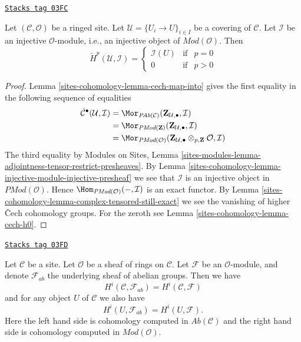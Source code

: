\begin{lemma}
\label{sites-cohomology-lemma-injective-module-trivial-cech}
\href{https://stacks.math.columbia.edu/tag/03FC}{\texttt{Stacks tag 03FC}}

Let $(\mathcal{C}, \mathcal{O})$ be a ringed site.
Let $\mathcal{U} = \{U_i \to U\}_{i \in I}$ be a covering of $\mathcal{C}$.
Let $\mathcal{I}$ be an injective $\mathcal{O}$-module, i.e., an injective
object of $\textit{Mod}(\mathcal{O})$. Then
$$
\check{H}^p(\mathcal{U}, \mathcal{I}) =
\left\{
\begin{matrix}
\mathcal{I}(U) & \text{if} & p = 0 \\
0 & \text{if} & p > 0
\end{matrix}
\right.
$$
\end{lemma}

\begin{proof}
Lemma \ref{sites-cohomology-lemma-cech-map-into} gives the first equality in the following
sequence of equalities
\begin{align*}
\check{\mathcal{C}}^\bullet(\mathcal{U}, \mathcal{I})
& =
\Mor_{\textit{PAb}(\mathcal{C})}(
\mathbf{Z}_{\mathcal{U}, \bullet}, \mathcal{I}) \\
& =
\Mor_{\textit{PMod}(\mathbf{Z})}(
\mathbf{Z}_{\mathcal{U}, \bullet}, \mathcal{I}) \\
& =
\Mor_{\textit{PMod}(\mathcal{O})}(
\mathbf{Z}_{\mathcal{U}, \bullet} \otimes_{p, \mathbf{Z}} \mathcal{O},
\mathcal{I})
\end{align*}
The third equality by
Modules on Sites,
Lemma \ref{sites-modules-lemma-adjointness-tensor-restrict-presheaves}.
By Lemma \ref{sites-cohomology-lemma-injective-module-injective-presheaf}
we see that $\mathcal{I}$ is an injective object in
$\textit{PMod}(\mathcal{O})$.
Hence $\Hom_{\textit{PMod}(\mathcal{O})}(-, \mathcal{I})$
is an exact functor. By
Lemma \ref{sites-cohomology-lemma-complex-tensored-still-exact} we see the vanishing of
higher {\v C}ech cohomology groups.
For the zeroth see Lemma \ref{sites-cohomology-lemma-cech-h0}.
\end{proof}

\begin{lemma}
\label{sites-cohomology-lemma-cohomology-modules-abelian-agree}
\href{https://stacks.math.columbia.edu/tag/03FD}{\texttt{Stacks tag 03FD}}

Let $\mathcal{C}$ be a site.
Let $\mathcal{O}$ be a sheaf of rings on $\mathcal{C}$.
Let $\mathcal{F}$ be an $\mathcal{O}$-module, and denote
$\mathcal{F}_{ab}$ the underlying sheaf of abelian groups.
Then we have
$$
H^i(\mathcal{C}, \mathcal{F}_{ab})
=
H^i(\mathcal{C}, \mathcal{F})
$$
and for any object $U$ of $\mathcal{C}$ we also have
$$
H^i(U, \mathcal{F}_{ab})
=
H^i(U, \mathcal{F}).
$$
Here the left hand side is cohomology computed in
$\textit{Ab}(\mathcal{C})$ and the right hand side
is cohomology computed in $\textit{Mod}(\mathcal{O})$.
\end{lemma}

